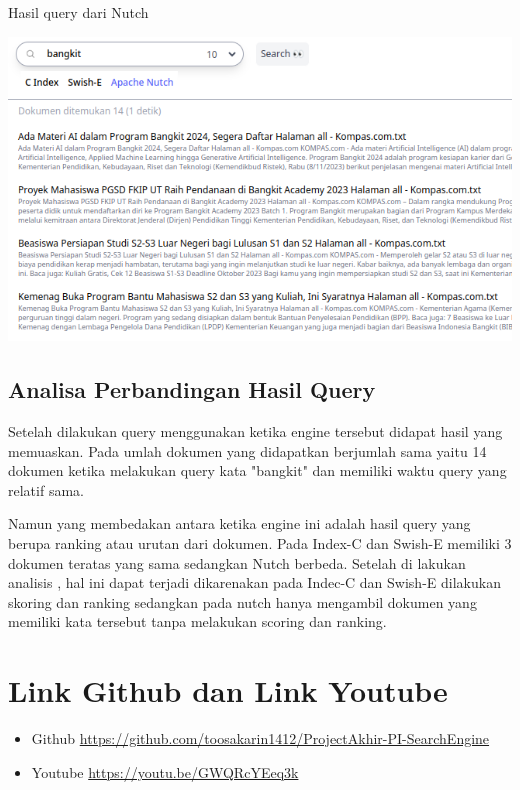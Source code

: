 \documentclass[12pt]{article}
\begin{document}
    \newpage
    Hasil query dari Nutch

    \includegraphics[scale=0.88]{images/query-nutch.png}

    \subsection*{Analisa Perbandingan Hasil Query}
    Setelah dilakukan query menggunakan ketika engine tersebut didapat hasil yang memuaskan. Pada umlah dokumen yang didapatkan berjumlah sama yaitu 14 dokumen ketika melakukan query kata "bangkit" dan memiliki waktu query yang relatif sama.

    Namun yang membedakan antara ketika engine ini adalah hasil query yang berupa ranking atau urutan dari dokumen. Pada Index-C dan Swish-E memiliki 3 dokumen teratas yang sama sedangkan Nutch berbeda. Setelah di lakukan analisis , hal ini dapat terjadi dikarenakan pada Indec-C dan Swish-E dilakukan skoring dan ranking sedangkan pada nutch hanya mengambil dokumen yang memiliki kata tersebut tanpa melakukan scoring dan ranking.

    \section*{Link Github dan Link Youtube}
    \begin{itemize}
        \item Github \href{https://github.com/toosakarin1412/ProjectAkhir-PI-SearchEngine}{https://github.com/toosakarin1412/ProjectAkhir-PI-SearchEngine}
        \item Youtube \href{https://youtu.be/GWQRcYEeq3k}{https://youtu.be/GWQRcYEeq3k}
    \end{itemize}

    
\end{document}
